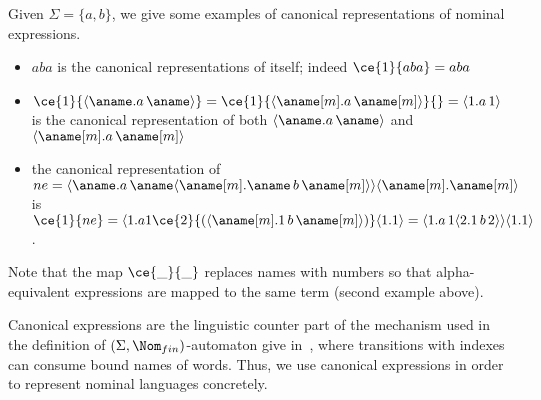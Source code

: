 \begin{example}
  Given $\Sigma=\{a,b\}$, we give some examples of canonical
  representations of nominal expressions.
  \begin{small}
  \begin{itemize}
  \item $aba$ is the canonical representations of itself; indeed $\ce{1}{aba} = aba$
  \item $\ce{1}{\langle \aname . a\, \aname \rangle} = \ce{1}{\langle \aname[m]. a\, \aname[m] \rangle}{}=\langle 1.a\,1 \rangle$
    is the canonical representation of both $\langle \aname.a\,\aname \rangle$ and $\langle \aname[m].a\,\aname[m] \rangle$
  \item the canonical representation of
    $ne = \langle \aname.a\,\aname \langle \aname[m].\aname\, b\, \aname[m]
    \rangle\rangle\langle \aname[m].\aname[m] \rangle$ is
    $\ce{1} {ne} = \langle 1.a1\ce{2}{(\langle \aname[m].1\, b \, \aname[m] \rangle)}\langle
    1.1\rangle \\=\langle 1.a\,1\langle 2.1\,b\,2 \rangle \rangle\langle 1.1
    \rangle$.
  \end{itemize}  
  \end{small}
  Note that the map $\ce{\_}{\_}$ replaces names with numbers so that
  alpha-equivalent expressions are mapped to the same term (second example above).
\end{example}
%
Canonical expressions are the linguistic counter part of the mechanism
used in the definition of $(\Sigma, \Nom_{fin})$-automaton give
in~\cite{Kurz0T13}, where transitions with indexes can consume
bound names of words.
%
Thus, we use canonical expressions in order to represent nominal
languages concretely.

